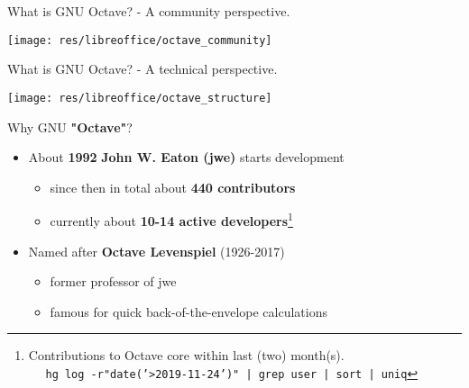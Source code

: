 \begin{frame}{What is GNU Octave? - A community perspective.}
\begin{center}
\texttt{[image: res/libreoffice/octave\_community]}
\end{center}
\end{frame}



\begin{frame}{What is GNU Octave? - A technical perspective.}
\vspace*{-1em}
\begin{center}
\texttt{[image: res/libreoffice/octave\_structure]}
\end{center}
\end{frame}



\begin{frame}{Why GNU \textbf{"Octave"}?}

\begin{itemize}
\itemsep2em
\item
About \textbf{1992} \textbf{\color{DarkBlue}John W. Eaton (jwe)}
starts development\\[0.5em]
\begin{itemize}
\itemsep1em
\item
since then in total about \textbf{440 contributors}
\item
currently about \textbf{10-14 active developers}\footnote{Contributions to Octave core within last (two) month(s). \\
$\quad$ \texttt{\tiny hg log -r"date('>2019-11-24')" | grep user | sort | uniq}}
\end{itemize}

\item
Named after \textbf{\color{DarkBlue}Octave Levenspiel} (1926-2017)\\[0.5em]
\begin{itemize}
\itemsep1em
\item
former professor of jwe
\item
famous for quick back-of-the-envelope calculations
\end{itemize}
\end{itemize}
\end{frame}


